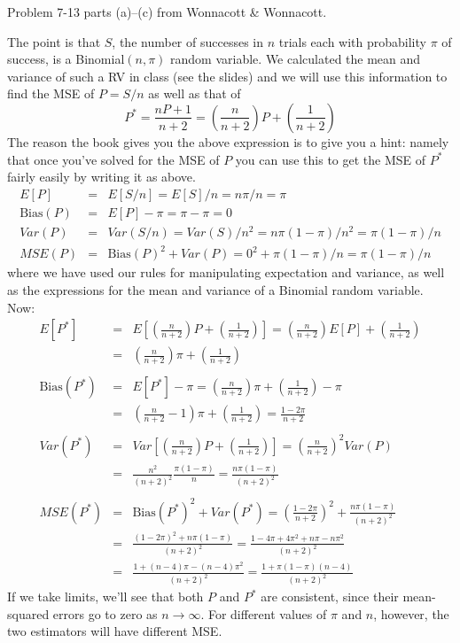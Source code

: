 \documentclass[addpoints,12pt]{exam}\usepackage[]{graphicx}\usepackage[]{xcolor}
\begin{document}
\begin{questions}
\question Problem 7-13 parts (a)--(c) from Wonnacott \& Wonnacott. 
    \begin{solution}
The point is that $S$, the number of successes in $n$ trials each with probability $\pi$ of success, is a Binomial$(n,\pi)$ random variable. We calculated the mean and variance of such a RV in class (see the slides) and we will use this information to find the MSE of $P = S/n$ as well as that of
  $$P^* = \frac{nP + 1}{n+2} = \left(\frac{n}{n+2}\right)P + \left(\frac{1}{n+2}\right)$$
The reason the book gives you the above expression is to give you a hint: namely that once you've solved for the MSE of $P$ you can use this to get the MSE of $P^*$ fairly easily by writing it as above.
  \begin{eqnarray*}
		E[P] &=& E[S/n] = E[S]/n = n\pi/n = \pi\\
		\mbox{Bias}(P) &=& E[P] - \pi = \pi - \pi = 0\\
		Var(P) &=& Var(S/n) = Var(S)/n^2 = n\pi(1-\pi)/n^2 = \pi(1-\pi)/n \\
		MSE(P) &=& \mbox{Bias}(P)^2 + Var(P) = 0^2 + \pi(1-\pi)/n = \pi(1-\pi)/n
	\end{eqnarray*}
where we have used our rules for manipulating expectation and variance, as well as the expressions for the mean and variance of a Binomial random variable. Now:
	\begin{eqnarray*}
		E[P^*] &=& E\left[ \left(\frac{n}{n+2}\right)P + \left(\frac{1}{n+2}\right)\right]=  \left(\frac{n}{n+2}\right)E[P] + \left(\frac{1}{n+2}\right)\\
			&=&  \left(\frac{n}{n+2}\right)\pi + \left(\frac{1}{n+2}\right)\\\\
		\mbox{Bias}(P^*) &=& E[P^*] - \pi =  \left(\frac{n}{n+2}\right)\pi + \left(\frac{1}{n+2}\right) - \pi\\
			&=&\left(\frac{n}{n+2} -1\right)\pi + \left(\frac{1}{n+2}\right) = \frac{1-2\pi}{n+2}\\\\
		Var(P^*) &=& Var\left[  \left(\frac{n}{n+2}\right)P + \left(\frac{1}{n+2}\right)\right] = \left(\frac{n}{n+2}\right)^2 Var(P)\\
		&=& \frac{n^2}{(n+2)^2} \frac{\pi(1-\pi)}{n} = \frac{n\pi(1-\pi)}{(n+2)^2}\\ \\
		MSE(P^*) &=& \mbox{Bias}(P^*)^2 + Var(P^*) = \left(\frac{1-2\pi}{n+2}\right)^2 + \frac{n\pi(1-\pi)}{(n+2)^2}\\
			&=& \frac{(1-2\pi)^2 + n\pi(1-\pi)}{(n+2)^2} = \frac{1 - 4\pi + 4\pi^2 + n\pi - n\pi^2}{(n+2)^2}\\
			&=& \frac{1 + (n-4)\pi - (n-4)\pi^2 }{(n+2)^2} =\frac{1 + \pi(1-\pi)(n-4)}{(n+2)^2}
	\end{eqnarray*}
	If we take limits, we'll see that both $P$ and $P^*$ are consistent, since their mean-squared errors go to zero as $n\rightarrow  \infty$. For different values of $\pi$ and $n$, however, the two estimators will have different MSE. %
    \end{solution}


\end{questions}
\end{document}
